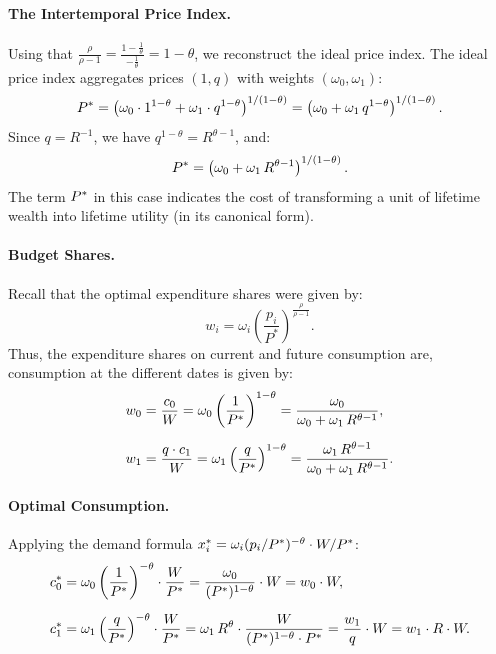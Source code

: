 \paragraph{The Intertemporal Price Index.}
Using that $\frac{\rho}{\rho-1}=\frac{1-\frac{1}{\theta}}{-\frac{1}{\theta}}=1-\theta$, we reconstruct the ideal price index.  The ideal price index aggregates prices $(1, q)$ with weights $(\omega_0, \omega_1)$:
\begin{equation}
P^{*} = \left( \omega_0 \cdot 1^{1-\theta} + \omega_1 \cdot q^{1-\theta} \right)^{1/(1-\theta)} = \left( \omega_0 + \omega_1 \, q^{1-\theta} \right)^{1/(1-\theta)}.
\label{eq:price-index-intertemporal}
\end{equation}
Since $q = R^{-1}$, we have $q^{1-\theta} = R^{\theta - 1}$, and:
\begin{equation}
P^{*} = \left( \omega_0 + \omega_1 \, R^{\theta - 1} \right)^{1/(1-\theta)}.
\label{eq:price-index-R}
\end{equation}
The term $P^{*}$ in this case indicates the cost of transforming a unit of lifetime wealth into lifetime utility (in its canonical form). 

\paragraph{Budget Shares.}
Recall that the optimal expenditure shares were given by:
\[
w_i=\omega_i\left(\frac{p_i}{P^{*}}\right)^{\frac{\rho}{\rho-1}}.
\]
Thus, the expenditure shares on current and future consumption are, consumption at the different dates is given by:
\begin{align}
w_0 &= \frac{c_0}{W} = \omega_0 \left( \frac{1}{P^{*}} \right)^{1-\theta} = \frac{\omega_0}{\omega_0 + \omega_1 \, R^{\theta-1}}, \label{eq:share-c0} \\[6pt]
w_1 &= \frac{q \cdot c_1}{W} = \omega_1 \left( \frac{q}{P^{*}} \right)^{1-\theta} = \frac{\omega_1 \, R^{\theta-1}}{\omega_0 + \omega_1 \, R^{\theta-1}}. \label{eq:share-c1}
\end{align}

\paragraph{Optimal Consumption.}
Applying the demand formula $x_i^* = \omega_i (p_i / P^{*})^{-\theta} \cdot W / P^{*}$:
\begin{align}
c_0^* &= \omega_0 \left( \frac{1}{P^{*}} \right)^{-\theta} \cdot \frac{W}{P^{*}} = \frac{\omega_0}{(P^{*})^{1-\theta}} \cdot W = w_0 \cdot W, \label{eq:c0-star} \\[6pt]
c_1^* &= \omega_1 \left( \frac{q}{P^{*}} \right)^{-\theta} \cdot \frac{W}{P^{*}} = \omega_1 \, R^{\theta} \cdot \frac{W}{(P^{*})^{1-\theta} \cdot P^{*}} = \frac{w_1}{q} \cdot W = w_1 \cdot R \cdot W. \label{eq:c1-star}
\end{align}

